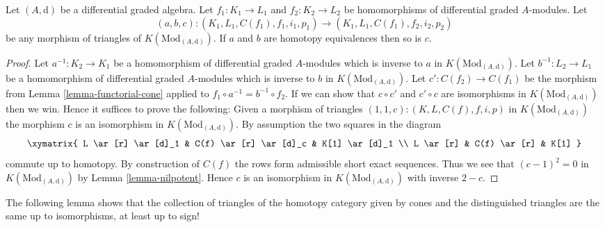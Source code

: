 \begin{lemma}
\label{lemma-third-isomorphism}
Let $(A, \text{d})$ be a differential graded algebra.
Let $f_1 : K_1 \to L_1$ and $f_2 : K_2 \to L_2$ be homomorphisms of
differential graded $A$-modules. Let
$$
(a, b, c) :
(K_1, L_1, C(f_1), f_1, i_1, p_1)
\longrightarrow
(K_1, L_1, C(f_1), f_2, i_2, p_2)
$$
be any morphism of triangles of $K(\text{Mod}_{(A, \text{d})})$.
If $a$ and $b$ are homotopy equivalences then so is $c$.
\end{lemma}

\begin{proof}
Let $a^{-1} : K_2 \to K_1$ be a homomorphism of differential graded $A$-modules
which is inverse to $a$ in $K(\text{Mod}_{(A, \text{d})})$.
Let $b^{-1} : L_2 \to L_1$ be a homomorphism of differential graded $A$-modules
which is inverse to $b$ in $K(\text{Mod}_{(A, \text{d})})$.
Let $c' : C(f_2) \to C(f_1)$ be the morphism from
Lemma \ref{lemma-functorial-cone} applied to
$f_1 \circ a^{-1} = b^{-1} \circ f_2$.
If we can show that $c \circ c'$ and $c' \circ c$ are isomorphisms in
$K(\text{Mod}_{(A, \text{d})})$
then we win. Hence it suffices to prove the following: Given
a morphism of triangles
$(1, 1, c) : (K, L, C(f), f, i, p)$
in $K(\text{Mod}_{(A, \text{d})})$ the morphism $c$ is an isomorphism
in $K(\text{Mod}_{(A, \text{d})})$.
By assumption the two squares in the diagram
$$
\xymatrix{
L \ar[r] \ar[d]_1 &
C(f) \ar[r] \ar[d]_c &
K[1] \ar[d]_1 \\
L \ar[r] &
C(f) \ar[r] &
K[1]
}
$$
commute up to homotopy. By construction of $C(f)$ the rows
form admissible short exact sequences. Thus we see that
$(c - 1)^2 = 0$ in $K(\text{Mod}_{(A, \text{d})})$ by
Lemma \ref{lemma-nilpotent}.
Hence $c$ is an isomorphism in $K(\text{Mod}_{(A, \text{d})})$
with inverse $2 - c$.
\end{proof}

\noindent
The following lemma shows that the collection of triangles of the homotopy
category given by cones and the distinguished triangles are the same
up to isomorphisms, at least up to sign!


